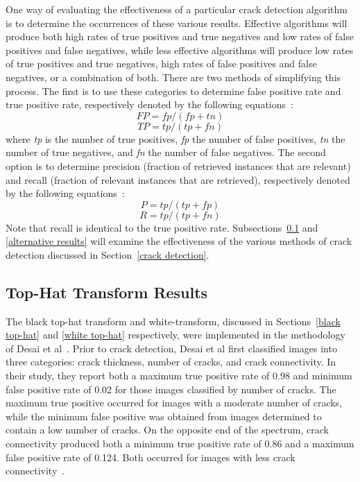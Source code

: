 \documentclass{sig-alternate}
\begin{document}
One way of evaluating the effectiveness of a particular crack detection algorithm is to determine the occurrences of these various results. Effective algorithms will produce both high rates of true positives and true negatives and low rates of false positives and false negatives, while less effective algorithms will produce low rates of true positives and true negatives, high rates of false positives and false negatives, or a combination of both. There are two methods of simplifying this process. The first is to use these categories to determine false positive rate and true positive rate, respectively denoted by the following equations~\cite{Statistics:2013}:
\begin{equation*}
FP = fp / (fp + tn)
\end{equation*}
\begin{equation*}
TP = tp / (tp + fn)
\end{equation*}
where \textit{tp} is the number of true positives, \textit{fp} the number of false positives, \textit{tn} the number of true negatives, and \textit{fn} the number of false negatives. The second option is to determine precision (fraction of retrieved instances that are relevant) and recall (fraction of relevant instances that are retrieved), respectively denoted by the following equations~\cite{Theran:2013}:
\begin{equation*}
P = tp / (tp + fp)
\end{equation*}
\begin{equation*}
R = tp / (tp + fn)
\end{equation*}
Note that recall is identical to the true positive rate. Subsections~\ref{top-hat results} and \ref{alternative results} will examine the effectiveness of the various methods of crack detection discussed in Section~\ref{crack detection}.

\subsection{Top-Hat Transform Results}\label{top-hat results}
The black top-hat transform and white-transform, discussed in Sections~\ref{black top-hat} and \ref{white top-hat} respectively, were implemented in the methodology of Desai et al~\cite{Statistics:2013}. Prior to crack detection, Desai et al first classified images into three categories: crack thickness, number of cracks, and crack connectivity. In their study, they report both a maximum true positive rate of 0.98 and minimum false positive rate of 0.02 for those images classified by number of cracks. The maximum true positive occurred for images with a moderate number of cracks, while the minimum false positive was obtained from images determined to contain a low number of cracks. On the opposite end of the spectrum, crack connectivity produced both a minimum true positive rate of 0.86 and a maximum false positive rate of 0.124. Both occurred for images with less crack connectivity~\cite{Statistics:2013}.
\end{document}
